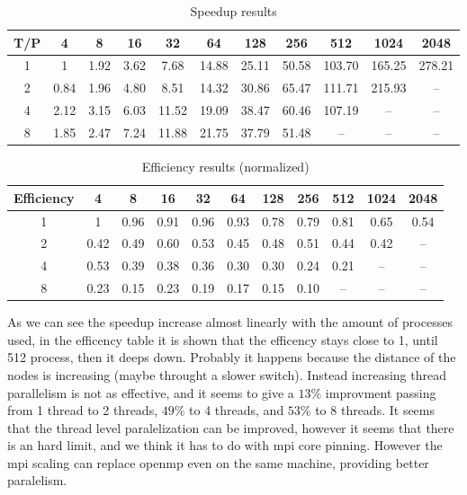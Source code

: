 \documentclass[10pt]{article}
\begin{document}
\begin{multicols}{2}
\begin{table}[H]
\centering
\tiny
\setlength{\tabcolsep}{3pt}
\begin{tabular}{|c|*{10}{c}|}
  \hline
  T/P & 4 & 8 & 16 & 32 & 64 & 128 & 256 & 512 & 1024 & 2048 \\
  \hline
  1 & 1 & 1.92 & 3.62 & 7.68 & 14.88 & 25.11 & 50.58 & 103.70 & 165.25 & 278.21 \\
  2 & 0.84 & 1.96 & 4.80 & 8.51 & 14.32 & 30.86 & 65.47 & 111.71 & 215.93 & -- \\
  4 & 2.12 & 3.15 & 6.03 & 11.52 & 19.09 & 38.47 & 60.46 & 107.19 & -- & -- \\
  8 & 1.85 & 2.47 & 7.24 & 11.88 & 21.75 & 37.79 & 51.48 & -- & -- & -- \\
  \hline
\end{tabular}
\caption{Speedup results}
\label{speedup_results}
\end{table}
\begin{table}[H]
\centering
\tiny
\setlength{\tabcolsep}{3pt}
\begin{tabular}{|c|*{10}{c}|}
  \hline
  Efficiency & 4 & 8 & 16 & 32 & 64 & 128 & 256 & 512 & 1024 & 2048 \\
  \hline
  1 & 1 & 0.96 & 0.91 & 0.96 & 0.93 & 0.78 & 0.79 & 0.81 & 0.65 & 0.54 \\
  2 & 0.42 & 0.49 & 0.60 & 0.53 & 0.45 & 0.48 & 0.51 & 0.44 & 0.42 & -- \\
  4 & 0.53 & 0.39 & 0.38 & 0.36 & 0.30 & 0.30 & 0.24 & 0.21 & -- & -- \\
  8 & 0.23 & 0.15 & 0.23 & 0.19 & 0.17 & 0.15 & 0.10 & -- & -- & -- \\
  \hline
\end{tabular}
\caption{Efficiency results (normalized)}
\label{efficiency_results_normalized}
\end{table}



As we can see the speedup increase almost linearly with the amount of processes used, in the efficency table it is shown that the efficency stays close to 1, until 512 process, then it deeps down. Probably it happens because the distance of the nodes is increasing (maybe throught a slower switch).
Instead increasing thread parallelism is not as effective, and it seems to give a $13\% $ improvment passing from 1 thread to 2 threads, $ 49\%$ to 4 threads, and $ 53\%$ to 8 threads.
It seems that the thread level paralelization can be improved, however it seems that there is an hard limit, and we think it has to do with mpi core pinning.
However the mpi scaling can replace openmp even on the same machine, providing better paralelism.




\end{multicols}
\end{document}
